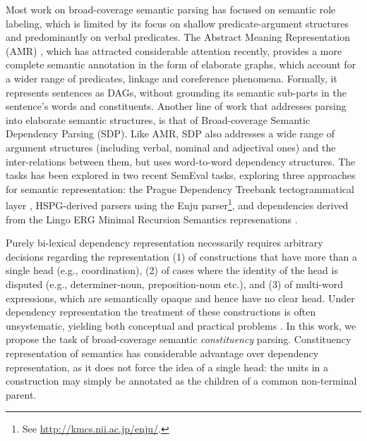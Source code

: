 \documentclass[11pt]{article}
\begin{document}
Most work on broad-coverage semantic parsing has focused on semantic role labeling,
which is limited by its focus on shallow predicate-argument structures and predominantly on verbal
predicates. The Abstract Meaning Representation (AMR) \cite{banarescu2013abstract},
which has attracted considerable attention recently,
provides a more complete semantic annotation in the form of elaborate graphs,
which account for a wider range of predicates, linkage and coreference phenomena.
Formally, it represents sentences as DAGs, without grounding its
semantic sub-parts in the sentence's words and constituents.
Another line of work that addresses parsing into elaborate semantic structures,
is that of Broad-coverage Semantic Dependency Parsing \cite{oepen2014semeval,oepen2015semeval} (SDP).
Like AMR, SDP also addresses a wide range of argument structures (including verbal, nominal and adjectival ones)
and the inter-relations between them, but uses word-to-word dependency structures.
The tasks has been explored in two recent SemEval tasks, exploring three approaches
for semantic representation: the Prague
Dependency Treebank tectogrammatical layer \cite{bohmova2003prague},
HSPG-derived parsers using the Enju parser\footnote{See \url{http://kmcs.nii.ac.jp/enju/}.},
and dependencies derived from the Lingo ERG
Minimal Recursion Semantics represenations \cite{Flic:02}.

Purely bi-lexical dependency representation necessarily requires arbitrary decisions regarding the representation (1) of constructions that have more than a single
head (e.g., coordination), (2) of cases where the identity of the head is disputed
(e.g., determiner-noun, preposition-noun etc.), and (3) of multi-word expressions,
which are semantically opaque and hence have no clear head. Under dependency representation
the treatment of these constructions is often unsystematic, yielding both conceptual
and practical problems \cite{schwartz2011neutralizing,Ivanova2012who,tsarfaty2012cross}.
In this work, we propose the task of broad-coverage semantic {\it constituency} parsing. 
Constituency representation of semantics has considerable advantage over dependency representation, as it does not force the idea of a single head: the units in a construction may simply be annotated as the children of a common non-terminal parent.
\end{document}
